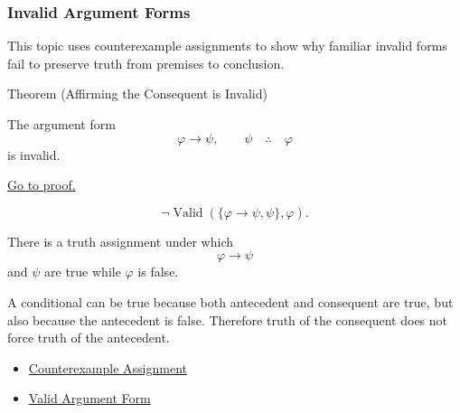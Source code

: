 \subsubsection*{Invalid Argument Forms}

\begin{remark*}
This topic uses counterexample assignments to show why familiar invalid forms
fail to preserve truth from premises to conclusion.
\end{remark*}

\begin{theorembox}{Theorem (Affirming the Consequent is Invalid)}
\begin{theorem}
\label{thm:affirming-consequent-invalid-propositional-logic}
The argument form
\[
\varphi\to\psi,\qquad \psi \quad\therefore\quad \varphi
\]
is invalid.

\noindent\hyperref[prf:affirming-consequent-invalid-propositional-logic]{Go to proof.}
\end{theorem}
\end{theorembox}

\begin{remark*}
\[
\neg\operatorname{Valid}(\{\varphi\to\psi,\psi\},\varphi).
\]
\end{remark*}

\begin{remark*}
There is a truth assignment under which \[
  \varphi\to\psi
\] and \(\psi\) are true
while \(\varphi\) is false.
\end{remark*}

\begin{remark*}[Interpretation]
A conditional can be true because both antecedent and consequent are true, but
also because the antecedent is false. Therefore truth of the consequent does not
force truth of the antecedent.
\end{remark*}

\begin{dependencies}
\begin{itemize}
  \item \hyperref[def:counterexample-assignment-propositional-logic]{Counterexample Assignment}
  \item \hyperref[def:valid-argument-form-propositional-logic]{Valid Argument Form}
\end{itemize}
\end{dependencies}


